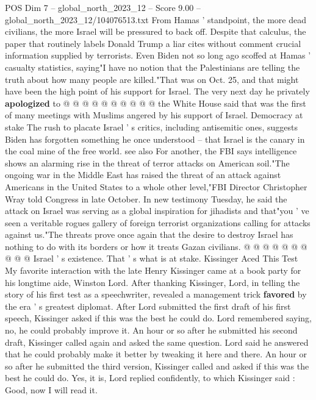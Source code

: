 \begin{textsample}{POS Dim 7 – global\_north\_2023\_12 – Score 9.00 – global\_north\_2023\_12/104076513.txt}
From Hamas ' standpoint, the more dead civilians, the more Israel will be pressured to back off.
Despite that calculus, the paper that routinely labels Donald Trump a liar cites without comment crucial information supplied by terrorists.
Even Biden not so long ago scoffed at Hamas ' casualty statistics, saying"I have no notion that the Palestinians are telling the truth about how many people are killed."That was on Oct. 25, and that might have been the high point of his support for Israel.
The very next day he privately \textbf{apologized} to @ @ @ @ @ @ @ @ @ @ the White House said that was the first of many meetings with Muslims angered by his support of Israel.
Democracy at stake The rush to placate Israel ' s critics, including antisemitic ones, suggests Biden has forgotten something he once understood -- that Israel is the canary in the coal mine of the free world. see also For another, the FBI says intelligence shows an alarming rise in the threat of terror attacks on American soil."The ongoing war in the Middle East has raised the threat of an attack against Americans in the United States to a whole other level,"FBI Director Christopher Wray told Congress in late October.
In new testimony Tuesday, he said the attack on Israel was serving as a global inspiration for jihadists and that"you ' ve seen a veritable rogues gallery of foreign terrorist organizations calling for attacks against us."The threats prove once again that the desire to destroy Israel has nothing to do with its borders or how it treats Gazan civilians. @ @ @ @ @ @ @ @ @ @ Israel ' s existence.
That ' s what is at stake.
Kissinger Aced This Test My favorite interaction with the late Henry Kissinger came at a book party for his longtime aide, Winston Lord.
After thanking Kissinger, Lord, in telling the story of his first test as a speechwriter, revealed a management trick \textbf{favored} by the era ' s greatest diplomat.
After Lord submitted the first draft of his first speech, Kissinger asked if this was the best he could do.
Lord remembered saying, no, he could probably improve it.
An hour or so after he submitted his second draft, Kissinger called again and asked the same question.
Lord said he answered that he could probably make it better by tweaking it here and there.
An hour or so after he submitted the third version, Kissinger called and asked if this was the best he could do.
Yes, it is, Lord replied confidently, to which Kissinger said : Good, now I will read it.

\end{textsample}
